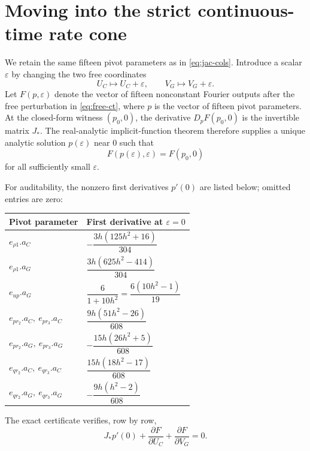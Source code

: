 \documentclass[11pt]{article}
\theoremstyle{remark}
\begin{document}
\section{Moving into the strict continuous-time rate cone}\label{sec:ct-extension}

We retain the same fifteen pivot parameters as in \eqref{eq:jac-cols}.  Introduce a scalar $\varepsilon$ by changing the two free coordinates
\begin{equation}\label{eq:free-ct}
  U_C\longmapsto U_C+\varepsilon,
  \qquad
  V_G\longmapsto V_G+\varepsilon.
\end{equation}
Let $F(p,\varepsilon)$ denote the vector of fifteen nonconstant Fourier outputs after the free perturbation in \eqref{eq:free-ct}, where $p$ is the vector of fifteen pivot parameters.  At the closed-form witness $(p_0,0)$, the derivative $D_pF(p_0,0)$ is the invertible matrix $J_*$.  The real-analytic implicit-function theorem therefore supplies a unique analytic solution $p(\varepsilon)$ near $0$ such that
\[
  F(p(\varepsilon),\varepsilon)=F(p_0,0)
\]
for all sufficiently small $\varepsilon$.

For auditability, the nonzero first derivatives $p'(0)$ are listed below; omitted entries are zero:
\begin{longtable}{@{}>{\raggedright\arraybackslash}p{}p{}@{}}
\toprule
Pivot parameter & First derivative at $\varepsilon=0$\\
\midrule
\endhead
$e_{\rho1}.a_C$ & $-\dfrac{3h(125h^2+16)}{304}$\\[2mm]
$e_{\rho1}.a_G$ & $\dfrac{3h(625h^2-414)}{304}$\\[2mm]
$e_{up}.a_G$ & $\dfrac{6}{1+10h^2}=\dfrac{6(10h^2-1)}{19}$\\[2mm]
$e_{pr_2}.a_C,\ e_{pr_3}.a_C$ & $\dfrac{9h(51h^2-26)}{608}$\\[2mm]
$e_{pr_2}.a_G,\ e_{pr_3}.a_G$ & $-\dfrac{15h(26h^2+5)}{608}$\\[2mm]
$e_{qr_2}.a_C,\ e_{qr_3}.a_C$ & $\dfrac{15h(18h^2-17)}{608}$\\[2mm]
$e_{qr_2}.a_G,\ e_{qr_3}.a_G$ & $-\dfrac{9h(h^2-2)}{608}$\\
\bottomrule
\end{longtable}
The exact certificate verifies, row by row,
\begin{equation}\label{eq:ift-linear}
  J_*p'(0)
  +\frac{\partial F}{\partial U_C}
  +\frac{\partial F}{\partial V_G}
  =0.
\end{equation}
\end{document}
